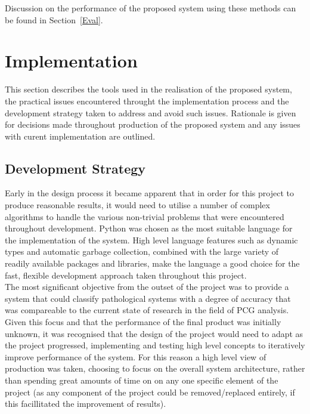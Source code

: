 \documentclass[titlepage, 12pt]{scrartcl} \usepackage{enumitem}
\begin{document}
Discussion on the performance of the proposed system using these methods can be
found in Section~\ref{Eval}.

\section{Implementation}
This section describes the tools used in the realisation of the
proposed system, the practical issues encountered throught the
implementation process and the development strategy taken to address and avoid
such issues. Rationale is given for decisions made throughout
production of the proposed system and any issues with curent implementation are
outlined.

\subsection{Development Strategy}
Early in the design process it became apparent that in order for this project
to produce reasonable results, it would need to utilise a number of complex
algorithms to handle the various non-trivial problems that were encountered
throughout development. Python was chosen as the most suitable language for the
implementation of the system. High level language features such as dynamic
types and automatic garbage collection, combined with the large variety of
readily available packages and libraries, make the language a good choice for
the fast, flexible development approach taken throughout this project.\\

The most significant objective from the outset of the project was to provide a
system that could classify pathological systems with a degree of accuracy that
was compareable to the current state of research in the field of PCG analysis.
Given this focus and that the performance of the final product was initially
unknown, it was recognised that the design of the project would need to adapt
as the project progressed, implementing and testing high level concepts to
iteratively improve performance of the system. For this reason a high level
view of production was taken, choosing to focus on the overall system
architecture, rather than spending great amounts of time on on any one specific
element of the project (as any component of the project could be
removed/replaced entirely, if this facillitated the improvement of results).\\
\end{document}
